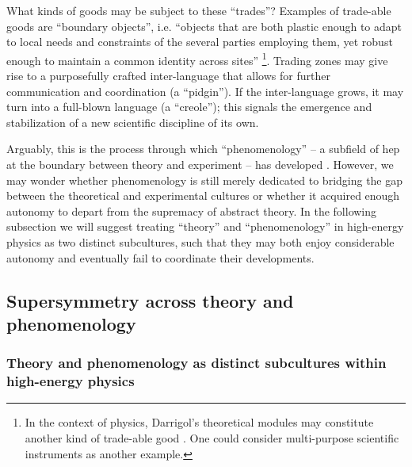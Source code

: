 \documentclass[smallextended]{svjour3}
\begin{document}
What kinds of goods may be subject to these ``trades''? Examples of trade-able goods are ``boundary objects'', i.e. ``objects that are both plastic enough to adapt to local needs and constraints of the several parties employing them, yet robust enough to maintain a common identity across sites'' \citep[p.~393]{Star1989}\footnote{In the context of physics, Darrigol's theoretical modules may constitute another kind of trade-able good \citep[p.~214]{Darrigol2007}. One could consider multi-purpose scientific instruments \citep[pp.~179--182]{Shinn2005} as another example.}. Trading zones may give rise to a purposefully crafted inter-language that allows for further communication and coordination (a ``pidgin''). If the inter-language grows, it may turn into a full-blown language (a ``creole''); this signals the emergence and stabilization of a new scientific discipline of its own. 

Arguably, this is the process through which ``phenomenology'' -- a subfield of \gls{hep} at the boundary between theory and experiment -- has developed \citep[p.~837]{galison1997image}. However, we may wonder whether phenomenology is still merely dedicated to bridging the gap between the theoretical and experimental cultures or whether it acquired enough autonomy to depart from the supremacy of abstract theory. In the following subsection we will suggest treating ``theory'' and ``phenomenology'' in high-energy physics as two distinct subcultures, such that they may both enjoy considerable autonomy and eventually fail to coordinate their developments.

\subsection{Supersymmetry across theory and phenomenology}
\label{section:hep_susy}

\subsubsection{Theory and phenomenology as distinct subcultures within high-energy physics}
\end{document}

